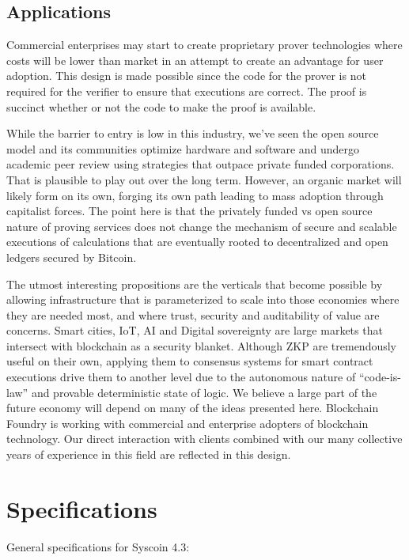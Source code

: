 \documentclass[peerreview]{ieeesyscoin}
\begin{document}
\subsection{Applications}

Commercial enterprises may start to create proprietary prover technologies where costs will be lower than market in an attempt to create an advantage for user adoption. This design is made possible since the code for the prover is not required for the verifier to ensure that executions are correct. The proof is succinct whether or not the code to make the proof is available.

While  the barrier to entry is low in this industry, we’ve seen the open source model and its communities optimize hardware and software and undergo academic peer review using strategies  that outpace private funded corporations. That is plausible to play out over the long term. However, an organic market will likely form on its own, forging its own path leading to mass adoption through capitalist forces. The point here is that the privately funded vs open source nature of proving services does not change the mechanism of secure and scalable executions of calculations that are eventually rooted to decentralized and open ledgers secured by Bitcoin.

The utmost interesting propositions are the verticals that become possible by allowing infrastructure that is parameterized to scale into those economies where they are needed most, and where trust, security and auditability of value are concerns. Smart cities, IoT, AI and Digital sovereignty are large markets that intersect with blockchain as a security blanket. Although ZKP are tremendously useful on their own, applying them to consensus systems for smart contract executions drive them to another level due to the autonomous nature of “code-is-law” and provable deterministic state of logic. We believe a large part of the future economy will depend on many of the ideas presented here. Blockchain Foundry is working with commercial and enterprise adopters of blockchain technology. Our direct interaction with clients combined with our many collective years of experience in this field are reflected in this design.


\section{Specifications}
\label{section:specs}

General specifications for Syscoin 4.3:
\end{document}
